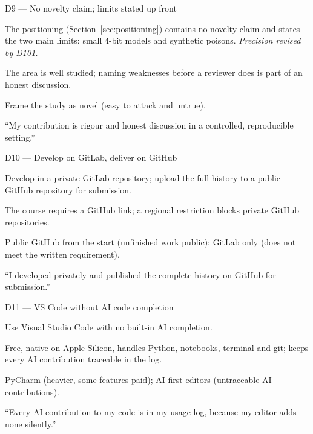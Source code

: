 \documentclass[11pt,a4paper]{report}
\begin{document}
\begin{decisionbox}{D9 --- No novelty claim; limits stated up front}
\begin{description}[nosep, leftmargin=0pt]
  \item[Decision.] The positioning (Section~\ref{sec:positioning}) contains no
    novelty claim and states the two main limits: small 4-bit models and synthetic poisons. \emph{Precision revised by D101.}
  \item[Why.] The area is well studied; naming weaknesses before a reviewer
    does is part of an honest discussion.
  \item[Alternatives.] Frame the study as novel (easy to attack and untrue).
  \item[Interview line.] ``My contribution is rigour and honest discussion in
    a controlled, reproducible setting.''
\end{description}
\end{decisionbox}



\begin{decisionbox}{D10 --- Develop on GitLab, deliver on GitHub}
\begin{description}[nosep, leftmargin=0pt]
  \item[Decision.] Develop in a private GitLab repository; upload the full
    history to a public GitHub repository for submission.
  \item[Why.] The course requires a GitHub link; a regional restriction
    blocks private GitHub repositories.
  \item[Alternatives.] Public GitHub from the start (unfinished work
    public); GitLab only (does not meet the written requirement).
  \item[Interview line.] ``I developed privately and published the complete
    history on GitHub for submission.''
\end{description}
\end{decisionbox}

\begin{decisionbox}{D11 --- VS Code without AI code completion}
\begin{description}[nosep, leftmargin=0pt]
  \item[Decision.] Use Visual Studio Code with no built-in AI completion.
  \item[Why.] Free, native on Apple Silicon, handles Python, notebooks,
    terminal and git; keeps every AI contribution traceable in the log.
  \item[Alternatives.] PyCharm (heavier, some features paid); AI-first
    editors (untraceable AI contributions).
  \item[Interview line.] ``Every AI contribution to my code is in my usage
    log, because my editor adds none silently.''
\end{description}
\end{decisionbox}
\end{document}

